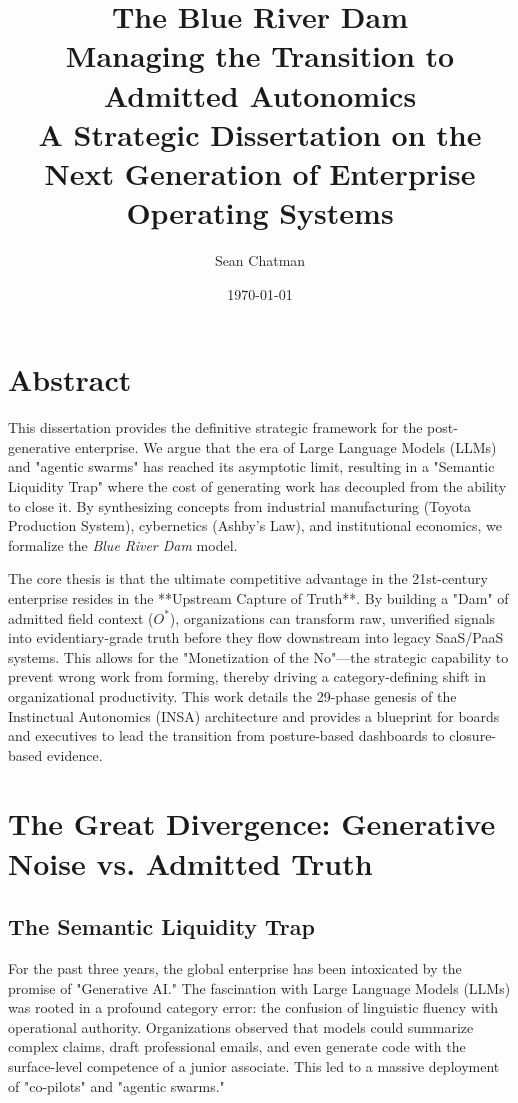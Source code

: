 \documentclass[12pt,a4paper,oneside]{book}
\title{\textbf{\huge \color{hbrblue}The Blue River Dam}\\\vspace{1em}\Large \color{hbrred}Managing the Transition to Admitted Autonomics\\\vspace{0.5em}A Strategic Dissertation on the Next Generation of Enterprise Operating Systems}
\author{Sean Chatman}
\date{\today}
\begin{document}
\maketitle

\chapter*{Abstract}
This dissertation provides the definitive strategic framework for the post-generative enterprise. We argue that the era of Large Language Models (LLMs) and "agentic swarms" has reached its asymptotic limit, resulting in a "Semantic Liquidity Trap" where the cost of generating work has decoupled from the ability to close it. By synthesizing concepts from industrial manufacturing (Toyota Production System), cybernetics (Ashby’s Law), and institutional economics, we formalize the \textit{Blue River Dam} model. 

The core thesis is that the ultimate competitive advantage in the 21st-century enterprise resides in the **Upstream Capture of Truth**. By building a "Dam" of admitted field context ($O^*$), organizations can transform raw, unverified signals into evidentiary-grade truth before they flow downstream into legacy SaaS/PaaS systems. This allows for the "Monetization of the No"---the strategic capability to prevent wrong work from forming, thereby driving a category-defining shift in organizational productivity. This work details the 29-phase genesis of the Instinctual Autonomics (INSA) architecture and provides a blueprint for boards and executives to lead the transition from posture-based dashboards to closure-based evidence.

\tableofcontents

\chapter{The Great Divergence: Generative Noise vs. Admitted Truth}

\section{The Semantic Liquidity Trap}
For the past three years, the global enterprise has been intoxicated by the promise of "Generative AI." The fascination with Large Language Models (LLMs) was rooted in a profound category error: the confusion of linguistic fluency with operational authority. Organizations observed that models could summarize complex claims, draft professional emails, and even generate code with the surface-level competence of a junior associate. This led to a massive deployment of "co-pilots" and "agentic swarms."
\end{document}
